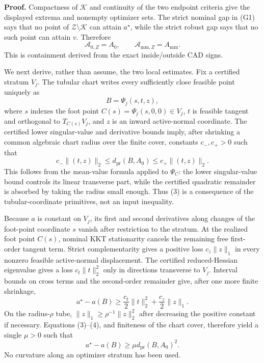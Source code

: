 \textbf{Proof.}
Compactness of \(\mathcal K\) and continuity of the two endpoint criteria give the displayed extrema and nonempty optimizer sets.  The strict nominal gap in (G1) says that no point of \(\mathcal Z\setminus\mathcal K\) can attain \(a^\star\), while the strict robust gap says that no such point can attain \(v\).  Therefore
\[
\mathcal A_{0,Z}=A_0,
\qquad
\mathcal A_{\mathrm{mm},Z}=A_{\mathrm{mm}}.
\tag{1}
\]
This is containment derived from the exact inside/outside CAD signs.

We next derive, rather than assume, the two local estimates.  Fix a certified stratum \(V_j\).  The tubular chart writes every sufficiently close feasible point uniquely as
\[
B=\Psi_j(s,t,z),
\tag{2}
\]
where \(s\) indexes the foot point \(C(s)=\Psi_j(s,0,0)\in V_j\), \(t\) is feasible tangent and orthogonal to \(T_{C(s)}V_j\), and \(z\) is an inward active-normal coordinate.  The certified lower singular-value and derivative bounds imply, after shrinking a common algebraic chart radius over the finite cover, constants \(c_-,c_+>0\) such that
\[
c_-\lVert(t,z)\rVert_2
\le d_{\mathrm{pr}}(B,A_0)
\le c_+\lVert(t,z)\rVert_2.
\tag{3}
\]
This follows from the mean-value formula applied to \(\Psi_C\): the lower singular-value bound controls its linear transverse part, while the certified quadratic remainder is absorbed by taking the radius small enough.  Thus (3) is a consequence of the tubular-coordinate primitives, not an input inequality.

Because \(a\) is constant on \(V_j\), its first and second derivatives along changes of the foot-point coordinate \(s\) vanish after restriction to the stratum.  At the realized foot point \(C(s)\), nominal KKT stationarity cancels the remaining free first-order tangent term.  Strict complementarity gives a positive loss \(c_z\lVert z\rVert_1\) in every nonzero feasible active-normal displacement.  The certified reduced-Hessian eigenvalue gives a loss \(c_t\lVert t\rVert_2^2\) only in directions transverse to \(V_j\).  Interval bounds on cross terms and the second-order remainder give, after one more finite shrinkage,
\[
a^\star-a(B)
\ge \frac{c_t}{2}\lVert t\rVert_2^2
+\frac{c_z}{2}\lVert z\rVert_1.
\tag{4}
\]
On the radius-\(\rho\) tube, \(\lVert z\rVert_1\ge\rho^{-1}\lVert z\rVert_2^2\) after decreasing the positive constant if necessary.  Equations (3)--(4), and finiteness of the chart cover, therefore yield a single \(\mu>0\) such that
\[
a^\star-a(B)\ge\mu d_{\mathrm{pr}}(B,A_0)^2.
\tag{5}
\]
No curvature along an optimizer stratum has been used.

